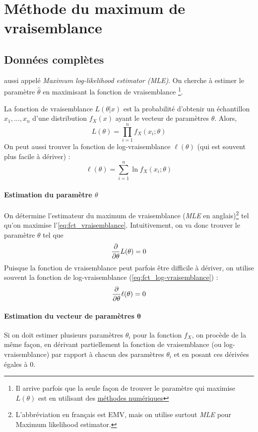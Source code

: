 \documentclass[12pt, french]{report}
\begin{document}
\section{Méthode du maximum de vraisemblance}
\subsection{Données complètes}
aussi appelé \emph{Maximum log-likelihood estimator (MLE)}. On cherche à estimer le paramètre $\hat{\theta}$ en maximisant la fonction de vraisemblance \footnote{Il arrive parfois que la seule façon de trouver le paramètre qui maximise $L(\theta)$ est en utilisant des \href{https://gitlab.com/vigou3/methodes-numeriques-en-actuariat}{méthodes numériques}}.

\begin{definition}
La fonction de vraisemblance $L(\theta  | x)$ est la probabilité d'obtenir un échantillon $x_1, ..., x_n$ d'une distribution $f_X(x)$ ayant le vecteur de paramètres ${\theta}$. Alors,
\begin{equation}
\label{eq:fct_vraisemblance}
L(\theta)	= \prod_{i=1}^{n} f_X(x_i ; \theta)
\end{equation}
On peut aussi trouver la fonction de log-vraisemblance $\ell(\theta)$ (qui est souvent plus facile à dériver) : 
\begin{equation}
\label{eq:fct_log-vraisemblance}
\ell(\theta) = \sum_{i=1}^{n} \ln f_X(x_i ; \theta)
\end{equation}
\end{definition}
\paragraph{Estimation du paramètre $\theta$} On détermine l'estimateur du maximum de vraisemblance (\emph{MLE} en anglais)\footnote{L'abbréviation en français est EMV, mais on utilise surtout \emph{MLE} pour Maximum likelihood estimator.} tel qu'on maximise l'\autoref{eq:fct_vraisemblance}. Intuitivement, on va donc trouver le paramètre $\theta$ tel que
\[\frac{\partial}{\partial \theta} L(\theta) = 0\]
Puisque la fonction de vraisemblance peut parfois être difficile à dériver, on utilise souvent la fonction de log-vraisemblance (\autoref{eq:fct_log-vraisemblance}) : 
\[\frac{\partial}{\partial \theta} \ell(\theta) = 0\]
\paragraph{Estimation du vecteur de paramètres $\boldsymbol{\theta}$}
Si on doit estimer plusieurs paramètres $\theta_i$ pour la fonction $f_X$, on procède de la même façon, en dérivant partiellement la fonction de vraisemblance (ou log-vraisemblance) par rapport à chacun des paramètres $\theta_i$ et en posant ces dérivées égales à 0.
\end{document}
